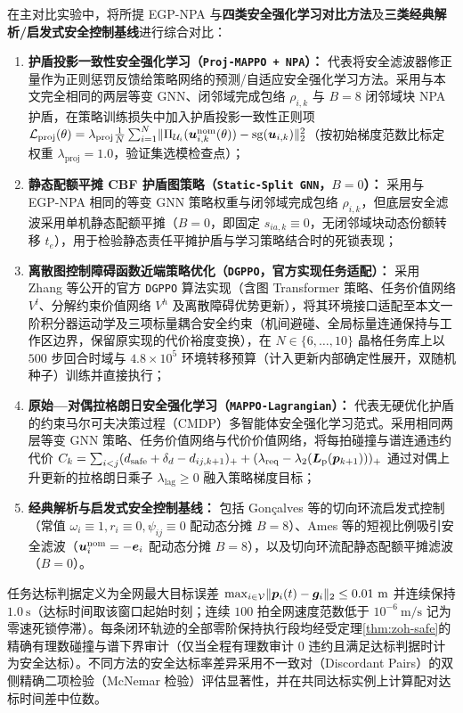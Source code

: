 在主对比实验中，将所提 EGP-NPA 与\textbf{四类安全强化学习对比方法}及\textbf{三类经典解析/启发式安全控制基线}进行综合对比：
\begin{enumerate}
 \item \textbf{护盾投影一致性安全强化学习（\texttt{Proj-MAPPO + NPA}\cite{wabersich2021,liu2026saferl}）：} 代表将安全滤波器修正量作为正则惩罚反馈给策略网络的预测/自适应安全强化学习方法。采用与本文完全相同的两层等变 GNN、闭邻域完成包络 $\rho_{i,k}$ 与 $B=8$ 闭邻域块 NPA 护盾，在策略训练损失中加入护盾投影一致性正则项 $\mathcal L_{\mathrm{proj}}(\theta)=\lambda_{\mathrm{proj}}\frac1N\sum_{i=1}^N\lVert\Pi_{\mathcal U_i}(\boldsymbol{u}_{i,k}^{\mathrm{nom}}(\theta))-\operatorname{sg}(\boldsymbol{u}_{i,k})\rVert_2^2$（按初始梯度范数比标定权重 $\lambda_{\mathrm{proj}}=1.0$，验证集选模检查点）；
 \item \textbf{静态配额平摊 CBF 护盾图策略（\texttt{Static-Split GNN}\cite{ames2017cbf,zhang2025gcbf}，$B=0$）：} 采用与 EGP-NPA 相同的等变 GNN 策略权重与闭邻域完成包络 $\rho_{i,k}$，但底层安全滤波采用单机静态配额平摊（$B=0$，即固定 $s_{ia,k}\equiv 0$，无闭邻域块动态份额转移 $t_e$），用于检验静态责任平摊护盾与学习策略结合时的死锁表现；
 \item \textbf{离散图控制障碍函数近端策略优化（\texttt{DGPPO}\cite{zhang2025dgppo}，官方实现任务适配）：} 采用 Zhang 等\cite{zhang2025dgppo}公开的官方 \texttt{DGPPO} 算法实现（含图 Transformer 策略、任务价值网络 $V^l$、分解约束价值网络 $V^h$ 及离散障碍优势更新），将其环境接口适配至本文一阶积分器运动学及三项标量耦合安全约束（机间避碰、全局标量连通保持与工作区边界，保留原实现的代价裕度变换），在 $N\in\{6,\dots,10\}$ 晶格任务库上以 $500$ 步回合时域与 $4.8\times 10^5$ 环境转移预算（计入更新内部确定性展开，双随机种子）训练并直接执行；
 \item \textbf{原始—对偶拉格朗日安全强化学习（\texttt{MAPPO-Lagrangian}\cite{gu2023safe}）：} 代表无硬优化护盾的约束马尔可夫决策过程（CMDP）多智能体安全强化学习范式。采用相同两层等变 GNN 策略、任务价值网络与代价价值网络，将每拍碰撞与谱连通违约代价 $C_k=\sum_{i<j}(d_{\mathrm{safe}}+\delta_d-d_{ij,k+1})_++(\lambda_{\mathrm{req}}-\lambda_2(\boldsymbol{L}_{\mathrm{p}}(\boldsymbol{p}_{k+1})))_+$ 通过对偶上升更新的拉格朗日乘子 $\lambda_{\mathrm{lag}}\ge 0$ 融入策略梯度目标；
 \item \textbf{经典解析与启发式安全控制基线：} 包括 Gon\c{c}alves 等\cite{goncalves2023circulation}的切向环流启发式控制（常值 $\omega_i\equiv 1,r_i\equiv 0,\psi_{ij}\equiv 0$ 配动态分摊 $B=8$）、Ames 等\cite{ames2017cbf,reis2021}的短视比例吸引安全滤波（$\boldsymbol{u}_i^{\mathrm{nom}}=-\boldsymbol{e}_i$ 配动态分摊 $B=8$），以及切向环流配静态配额平摊滤波（$B=0$）。
\end{enumerate}
任务达标判据定义为全网最大目标误差 $\max_{i\in\mathcal V}\lVert\boldsymbol{p}_i(t)-\boldsymbol{g}_i\rVert_2\le 0.01\ \mathrm m$ 并连续保持 $1.0\ \mathrm s$（达标时间取该窗口起始时刻；连续 $100$ 拍全网速度范数低于 $10^{-6}\ \mathrm{m/s}$ 记为零速死锁停滞）。每条闭环轨迹的全部零阶保持执行段均经受定理\ref{thm:zoh-safe}的精确有理数碰撞与谱下界审计（仅当全程有理数审计 $0$ 违约且满足达标判据时计为安全达标）。不同方法的安全达标率差异采用不一致对（Discordant Pairs）的双侧精确二项检验（McNemar 检验）评估显著性，并在共同达标实例上计算配对达标时间差中位数。

